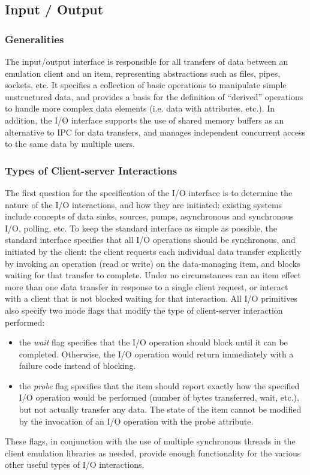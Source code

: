 \subsection{Input / Output}

\subsubsection{Generalities}

The input/output interface is responsible for all transfers of data
between an emulation client and an item, representing abstractions such
as files, pipes, sockets, etc. It specifies a collection of basic
operations to manipulate simple unstructured data, and provides a
basis for the definition of ``derived'' operations to handle more
complex data elements (i.e. data with attributes, etc.). In addition,
the I/O interface supports the use of shared memory buffers as an
alternative to IPC for data transfers, and manages independent
concurrent access to the same data by multiple users.

\subsubsection{Types of Client-server Interactions}

The first question for the specification of the I/O interface is to
determine the nature of the I/O interactions, and how they are
initiated: existing systems include concepts of data sinks, sources,
pumps, asynchronous and synchronous I/O, polling, etc. To keep the
standard interface as simple as possible, the standard interface
specifies that all I/O operations should be synchronous, and initiated
by the client: the client requests each individual data transfer
explicitly by invoking an operation (read or write) on the
data-managing item, and blocks waiting for that transfer to complete.
Under no circumstances can an item effect more than one data transfer
in response to a single client request, or interact with a client that
is not blocked waiting for that interaction.  All I/O primitives also
specify two mode flags that modify the type of client-server
interaction performed:
\begin{itemize}
\item the {\em wait} flag specifies that the I/O operation should
block until it can be completed. Otherwise, the I/O operation would
return immediately with a failure code instead of blocking.

\item the {\em probe} flag specifies that the item should report
exactly how the specified I/O operation would be performed (number of
bytes transferred, wait, etc.), but not actually transfer any data.
The state of the item cannot be modified by the invocation of an I/O
operation with the probe attribute.
\end{itemize}
These flags, in conjunction with the use of multiple synchronous
threads in the client emulation libraries as needed, provide enough
functionality for the various other useful types of I/O interactions.

